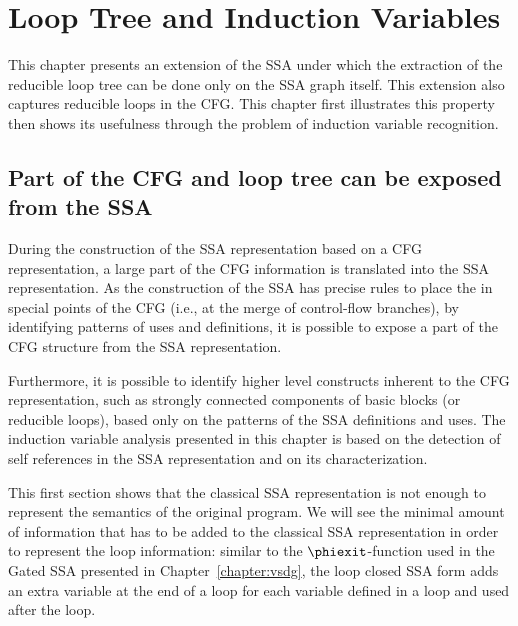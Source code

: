 {
\LinesNumberedHidden
  \def\bb#1{$\textit{bb}_{#1}$}

\chapter{Loop Tree and Induction Variables }
\label{chapter:loop_tree}


\providecommand{\SSA}{SSA}
\providecommand{\CFG}{CFG}
\providecommand{\loopphi}{loop-$\phi$}
\providecommand{\closephi}{close-$\phi$}
\providecommand{\CHREC}[1]{\{#1\}}

This chapter presents an extension of the \SSA{} under which the extraction of the reducible loop tree can be done only on the \SSA{} graph itself. 
This extension also captures reducible loops in the CFG. 
This chapter first illustrates this property then shows its usefulness through the problem of induction variable recognition.

\section{Part of the \CFG{} and loop tree can be exposed from the \SSA{}}

During the construction of the \SSA{} representation based on a \CFG{} representation, a large part of the \CFG{} information is translated into the \SSA{} representation. 
As the construction of the \SSA{} has precise rules to place the \phinodes in special points of the \CFG{} (i.e., at the merge of control-flow branches), by identifying patterns of uses and definitions, it is possible to expose a part of the \CFG{} structure from the \SSA{} representation.

Furthermore, it is possible to identify higher level constructs inherent to the \CFG{} representation, such as strongly connected components of basic blocks (or reducible loops), based only on the patterns of the \SSA{} definitions and uses. 
The induction variable analysis presented in this chapter is based on the detection of self references in the \SSA{} representation and on its characterization.

This first section shows that the classical \SSA{} representation is not enough to represent the semantics of the original program. 
We will see the minimal amount of information that has to be added to the classical \SSA{} representation in order to represent the loop information: 
similar to the $\phiexit$-function used in the Gated \SSA{} presented in Chapter~\ref{chapter:vsdg}, the loop closed \SSA{} form adds an extra variable at the end of a loop for each variable defined in a loop and used after the loop.

}
